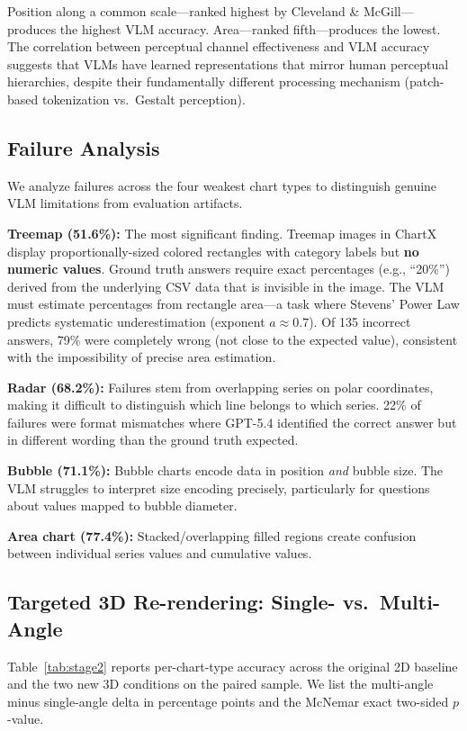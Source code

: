 \documentclass[sigconf, 10pt]{acmart}
\begin{document}
Position along a common scale---ranked highest by Cleveland \& McGill---produces the highest VLM accuracy. Area---ranked fifth---produces the lowest. The correlation between perceptual channel effectiveness and VLM accuracy suggests that VLMs have learned representations that mirror human perceptual hierarchies, despite their fundamentally different processing mechanism (patch-based tokenization vs.\ Gestalt perception).

\subsection{Failure Analysis}

We analyze failures across the four weakest chart types to distinguish genuine VLM limitations from evaluation artifacts.

\textbf{Treemap (51.6\%):} The most significant finding. Treemap images in ChartX display proportionally-sized colored rectangles with category labels but \textbf{no numeric values}. Ground truth answers require exact percentages (e.g., ``20\%'') derived from the underlying CSV data that is invisible in the image. The VLM must estimate percentages from rectangle area---a task where Stevens' Power Law predicts systematic underestimation (exponent $a \approx 0.7$). Of 135 incorrect answers, 79\% were completely wrong (not close to the expected value), consistent with the impossibility of precise area estimation.

\textbf{Radar (68.2\%):} Failures stem from overlapping series on polar coordinates, making it difficult to distinguish which line belongs to which series. 22\% of failures were format mismatches where GPT-5.4 identified the correct answer but in different wording than the ground truth expected.

\textbf{Bubble (71.1\%):} Bubble charts encode data in position \textit{and} bubble size. The VLM struggles to interpret size encoding precisely, particularly for questions about values mapped to bubble diameter.

\textbf{Area chart (77.4\%):} Stacked/overlapping filled regions create confusion between individual series values and cumulative values.

\subsection{Targeted 3D Re-rendering: Single- vs.\ Multi-Angle}
Table~\ref{tab:stage2} reports per-chart-type accuracy across the original 2D baseline and the two new 3D conditions on the paired sample. We list the multi-angle minus single-angle delta in percentage points and the McNemar exact two-sided $p$-value.
\end{document}
